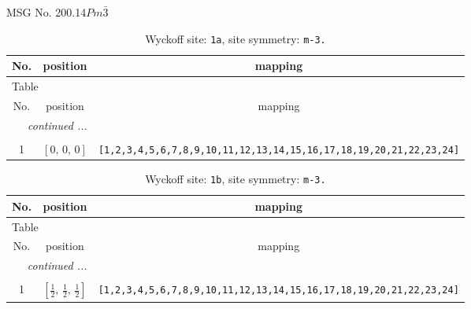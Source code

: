 \documentclass[fleqn,8pt]{jsarticle}
\begin{document}
\setcounter{MaxMatrixCols}{32}

\renewcommand{\tablename}{Table~}
\renewcommand{\figurename}{Figure~}
\begin{center}
\LARGE
MSG No. 200.14\quad$Pm\bar{3}$
\end{center}
\renewcommand{\arraystretch}{1.2}
\begin{longtable}{ccc}
\caption{Wyckoff site: {\tt 1a}, site symmetry: {\tt m-3.}}
 \\
 \hline \hline
No. & position & mapping \\ \hline \endfirsthead

\multicolumn{2}{l}{\tablename\ \thetable{}} \\
 \hline \hline
No. & position & mapping \\ \hline \endhead

 \hline \hline
\multicolumn{2}{r}{\footnotesize\it continued ...} \\ \endfoot

 \hline \hline
\multicolumn{2}{r}{} \\ \endlastfoot

1 & $\left[ 0,\, 0,\, 0 \right]$ & {\tt [1,2,3,4,5,6,7,8,9,10,11,12,13,14,15,16,17,18,19,20,21,22,23,24]} \\
\end{longtable}
\renewcommand{\arraystretch}{1.2}
\begin{longtable}{ccc}
\caption{Wyckoff site: {\tt 1b}, site symmetry: {\tt m-3.}}
 \\
 \hline \hline
No. & position & mapping \\ \hline \endfirsthead

\multicolumn{2}{l}{\tablename\ \thetable{}} \\
 \hline \hline
No. & position & mapping \\ \hline \endhead

 \hline \hline
\multicolumn{2}{r}{\footnotesize\it continued ...} \\ \endfoot

 \hline \hline
\multicolumn{2}{r}{} \\ \endlastfoot

1 & $\left[ \frac{1}{2},\, \frac{1}{2},\, \frac{1}{2} \right]$ & {\tt [1,2,3,4,5,6,7,8,9,10,11,12,13,14,15,16,17,18,19,20,21,22,23,24]} \\
\end{longtable}
\renewcommand{\arraystretch}{1.2}
\end{document}
